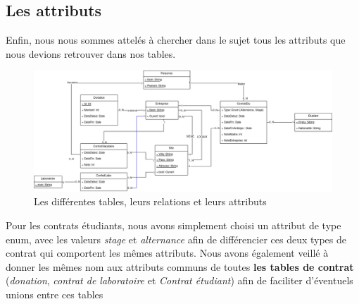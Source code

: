 \documentclass[french,12pt,a4paper,titlepage]{report}
\begin{document}
		\subsection{Les attributs}
		Enfin, nous nous sommes attelés à chercher dans le sujet tous les attributs que nous devions retrouver dans nos tables.
		\begin{figure}[ht]
			\centering
			\includegraphics[width=1\linewidth]{rapports_assets/diag_db_complete.png} 
			\caption{Les différentes tables, leurs relations et leurs attributs}
		\end{figure}
		Pour les contrats étudiants, nous avons simplement choisi un attribut de type enum, avec les valeurs \textit{stage} et \textit{alternance} afin de différencier ces deux types de contrat qui comportent les mêmes attributs.
		\newline
		Nous avons également veillé à donner les mêmes nom aux attributs communs de toutes \textbf{les tables de contrat} (\textit{donation}, \textit{contrat de laboratoire} et \textit{Contrat étudiant}) afin de faciliter d'éventuels unions entre ces tables
\end{document}
